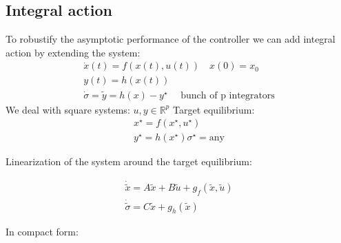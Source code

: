 \documentclass{book}
\newcommand{\R}{\mathbb{R}}
\theoremstyle{definition}
\theoremstyle{remark}
\theoremstyle{remark}
\begin{document}
\subsection{Integral action}
To robustify the asymptotic performance of the controller we can add integral action by extending the system:\\
\begin{gather*}
    \dot{x}(t)=f(x(t),u(t)) \quad x(0)=x_0\\
    y(t)=h(x(t))\\
    \dot{\sigma}=\tilde{y}=h(x)-y^\star \quad \text{ bunch of p integrators}
\end{gather*}
We deal with square systems: $u,y \in \R^p$
Target equilibrium:
\begin{gather*}
    x^\star=f(x^\star,u^\star)\\
    y^\star=h(x^\star)
    \sigma^\star=\text{any}
\end{gather*}

Linearization of the system around the target equilibrium:

\begin{gather*}
    \dot{\tilde{x}}=A\tilde{x}+B\tilde{u} +g_f(\tilde{x},\tilde{u})\\
    \dot{\tilde{\sigma}}=C\tilde{x}+g_h(\tilde{x})
\end{gather*}

In compact form:
\end{document}

